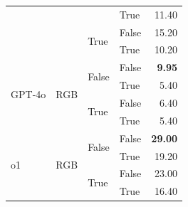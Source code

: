\documentclass{article}
\begin{document}
\begin{table}
\begin{center}
{\begin{tabular}{@{}llllr@{}}
                                                                        &                           &                           & True                      & 11.40 \\
                                                                        &                           & \multirow[c]{2}{*}{True}  & False                     & 15.20 \\
                                                                        &                           &                           & True                      & 10.20 \\
    \midrule
    \multirow[c]{4}{*}{GPT-4o}                                          & \multirow[c]{4}{*}{RGB}   & \multirow[c]{2}{*}{False} & False                     & \textbf{9.95} \\
                                                                        &                           &                           & True                      & 5.40 \\
                                                                        &                           & \multirow[c]{2}{*}{True}  & False                     & 6.40 \\
                                                                        &                           &                           & True                      & 5.40 \\
    \midrule
    \multirow[c]{4}{*}{o1}                                              & \multirow[c]{4}{*}{RGB}   & \multirow[c]{2}{*}{False} & False                     & \textbf{29.00} \\
                                                                        &                           &                           & True                      & 19.20 \\
                                                                        &                           & \multirow[c]{2}{*}{True}  & False                     & 23.00 \\
                                                                        &                           &                           & True                      & 16.40 \\
   \bottomrule
\end{tabular}
}
    \end{center}
    \label{tab:atari-ablation}
\end{table}
\end{document}
